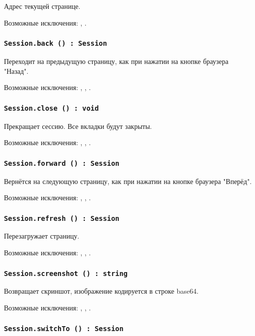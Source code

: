 Адрес текущей странице.

Возможные исключения: , .

\subsubsection{\lstinline|Session.back () : Session|}

Переходит на предыдущую страницу, как при нажатии на кнопке браузера "Назад".

Возможные исключения: , , .

\subsubsection{\lstinline|Session.close () : void|}

Прекращает сессию. Все вкладки будут закрыты.

Возможные исключения: , , .

\subsubsection{\lstinline|Session.forward () : Session|}

Вернётся на следующую страницу, как при нажатии на кнопке браузера "Вперёд".

Возможные исключения: , , .

\subsubsection{\lstinline|Session.refresh () : Session|}

Перезагружает страницу.

Возможные исключения: , , .

\subsubsection{\lstinline|Session.screenshot () : string|}

Возвращает скриншот, изображение кодируется в строке base64.

Возможные исключения: , , .

\subsubsection{\lstinline|Session.switchTo () : Session|}

